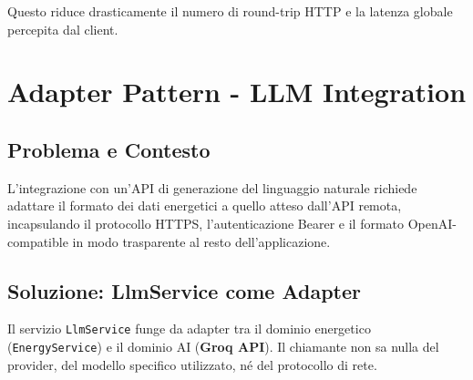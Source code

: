 \documentclass[a4paper,12pt]{report}
\begin{document}
Questo riduce drasticamente il numero di round-trip HTTP e la latenza globale percepita dal client.

\section{Adapter Pattern - LLM Integration}

\subsection{Problema e Contesto}
L'integrazione con un'API di generazione del linguaggio naturale richiede adattare il formato dei dati energetici a quello atteso dall'API remota, incapsulando il protocollo HTTPS, l'autenticazione Bearer e il formato OpenAI-compatible in modo trasparente al resto dell'applicazione.

\subsection{Soluzione: LlmService come Adapter}
Il servizio \texttt{LlmService} funge da adapter tra il dominio energetico (\texttt{EnergyService}) e il dominio AI (\textbf{Groq API}). Il chiamante non sa nulla del provider, del modello specifico utilizzato, né del protocollo di rete.
\end{document}
